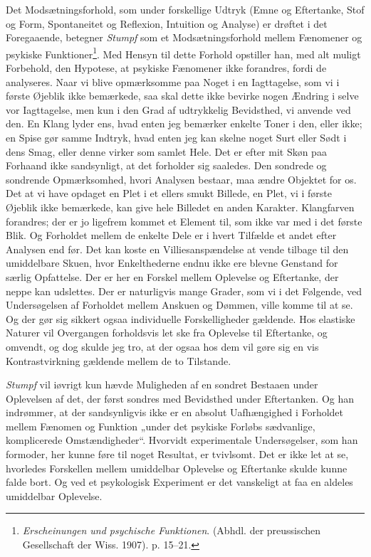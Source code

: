 \documentclass[12pt,a4paper]{book}
\newcommand{\apage}[1]{\marginnote{\footnotesize\textit{[#1]}}}
\begin{document}
\apage{18} Det Modsætningsforhold, som under forskellige Udtryk (Emne og
Eftertanke, Stof og Form, Spontaneitet og Reflexion, Intuition og
Analyse) er drøftet i det Foregaaende, betegner \emph{Stumpf} som et
Modsætningsforhold mellem Fænomener og psykiske
Funktioner\footnote{\emph{Erscheinungen und psychische Funktionen}.
(Abhdl. der preussischen Gesellschaft der Wiss. 1907). p. 15--21.}.
Med Hensyn til dette Forhold opstiller han, med alt muligt Forbehold,
den Hypotese, at psykiske Fænomener ikke forandres, fordi de
analyseres. Naar vi blive opmærksomme paa Noget i en Iagttagelse, som
vi i første Øjeblik ikke bemærkede, saa skal dette ikke bevirke nogen
Ændring i selve vor Iagttagelse, men kun i den Grad af udtrykkelig
Bevidsthed, vi anvende ved den. En Klang lyder ens, hvad enten jeg
bemærker enkelte Toner i den, eller ikke; en Spise gør samme Indtryk,
hvad enten jeg kan skelne noget Surt eller Sødt i dens Smag, eller
denne virker som samlet Hele. Det er efter mit Skøn paa Forhaand ikke
sandsynligt, at det forholder sig saaledes. Den sondrede og sondrende
Opmærksomhed, hvori Analysen bestaar, maa ændre Objektet for os. Det
at vi have opdaget en Plet i et ellers smukt Billede, en Plet, vi i
første Øjeblik ikke bemærkede, kan give hele Billedet en anden
Karakter. Klangfarven forandres; der er jo ligefrem kommet et Element
til, som ikke var med i det første Blik. Og Forholdet mellem de
enkelte Dele er i hvert Tilfælde et andet efter Analysen end før. Det
kan koste en Villiesanspændelse at vende tilbage til den umiddelbare
Skuen, hvor Enkelthederne endnu ikke ere blevne Genstand for særlig
Opfattelse. Der er her en Forskel mellem Oplevelse og Eftertanke, der
neppe kan udslettes. Der er naturligvis mange Grader, som vi i det
Følgende, ved Undersøgelsen af Forholdet mellem Anskuen og Dømmen,
ville komme til at se. Og der gør sig sikkert ogsaa individuelle
Forskelligheder gældende. Hos elastiske Naturer vil Overgangen
forholdsvis let ske fra Oplevelse til Eftertanke, og omvendt, og dog
skulde jeg tro, at der ogsaa hos dem vil gøre sig en vis
Kontrastvirkning gældende mellem de to Tilstande.

\apage{19} \emph{Stumpf} vil iøvrigt kun hævde Muligheden af en sondret Bestaaen
under Oplevelsen af det, der først sondres med Bevidsthed under
Eftertanken. Og han indrømmer, at der sandsynligvis ikke er en absolut
Uafhængighed i Forholdet mellem Fænomen og Funktion „under det
psykiske Forløbs sædvanlige, komplicerede Omstændigheder“. Hvorvidt
experimentale Undersøgelser, som han formoder, her kunne føre til
noget Resultat, er tvivlsomt. Det er ikke let at se, hvorledes
Forskellen mellem umiddelbar Oplevelse og Eftertanke skulde kunne
falde bort. Og ved et psykologisk Experiment er det vanskeligt at faa
en aldeles umiddelbar Oplevelse.
\end{document}

